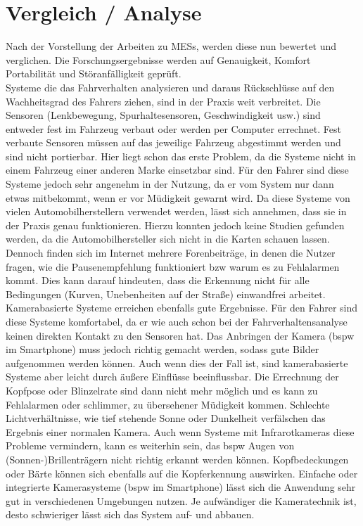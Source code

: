 {\section{Vergleich / Analyse}
\label{chap:an}
Nach der Vorstellung der Arbeiten zu \acl{MESs}, werden diese nun bewertet und verglichen. Die Forschungsergebnisse werden auf Genauigkeit, Komfort  Portabilität und Störanfälligkeit geprüft.\\

Systeme die das Fahrverhalten analysieren und daraus Rückschlüsse auf den Wachheitsgrad des Fahrers ziehen, sind in der Praxis weit verbreitet. Die Sensoren (Lenkbewegung, Spurhaltesensoren, Geschwindigkeit usw.) sind entweder fest im Fahrzeug verbaut oder werden per Computer errechnet. Fest verbaute Sensoren müssen auf das jeweilige Fahrzeug abgestimmt werden und sind nicht portierbar. Hier liegt schon das erste Problem, da die Systeme nicht in einem Fahrzeug einer anderen Marke einsetzbar sind. Für den Fahrer sind diese Systeme jedoch sehr angenehm in der Nutzung, da er vom System nur dann etwas mitbekommt, wenn er vor Müdigkeit gewarnt wird. Da diese Systeme von vielen Automobilherstellern verwendet werden, lässt sich annehmen, dass sie in der Praxis genau funktionieren. Hierzu konnten jedoch keine Studien gefunden werden, da die Automobilhersteller sich nicht in die Karten schauen lassen. Dennoch finden sich im Internet mehrere Forenbeiträge, in denen die Nutzer fragen, wie die Pausenempfehlung  funktioniert \acl{bzw} warum es zu Fehlalarmen kommt. Dies kann darauf hindeuten, dass die Erkennung nicht für alle Bedingungen (Kurven, Unebenheiten auf der Straße) einwandfrei arbeitet. \\

Kamerabasierte Systeme erreichen ebenfalls gute Ergebnisse. Für den Fahrer sind diese Systeme komfortabel, da er wie auch schon bei der Fahrverhaltensanalyse keinen direkten Kontakt zu den Sensoren hat. Das Anbringen der Kamera (\acl{bspw} im Smartphone) muss jedoch richtig gemacht werden, sodass gute Bilder aufgenommen werden können. Auch wenn dies der Fall ist, sind kamerabasierte Systeme aber leicht durch äußere Einflüsse beeinflussbar. Die Errechnung der Kopfpose oder Blinzelrate sind dann nicht mehr möglich und es kann zu Fehlalarmen oder schlimmer, zu übersehener Müdigkeit kommen. Schlechte Lichtverhältnisse, wie tief stehende Sonne oder Dunkelheit verfälschen das Ergebnis einer normalen Kamera. Auch wenn Systeme mit Infrarotkameras diese Probleme vermindern, kann es weiterhin sein, das \acl{bspw} Augen von (Sonnen-)Brillenträgern nicht richtig erkannt werden können. Kopfbedeckungen oder Bärte können sich ebenfalls auf die Kopferkennung auswirken. Einfache oder integrierte Kamerasysteme (\acl{bspw} im Smartphone) lässt sich die Anwendung sehr gut in verschiedenen Umgebungen nutzen. Je aufwändiger die Kameratechnik ist, desto schwieriger lässt sich das System auf- und abbauen. \\

}
